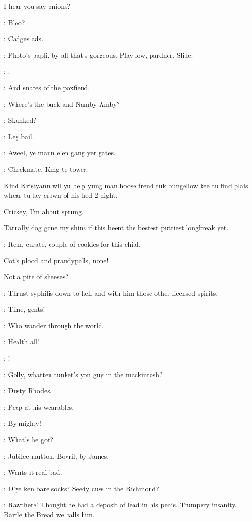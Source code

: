 I hear you say onions?

\bannon: Bloo?

\dixon: Cadges ads.

\bannon: Photo's papli, by all that's gorgeous.
Play low, pardner.
Slide.

\mulligan: .


\stephen: And snares of the poxfiend.

\bantam: Where's the buck and Namby Amby?

\stephen: Skunked?

\lenehan: Leg bail.

\crotthers: Aweel, ye maun e'en gang yer gates.

\stephen: Checkmate. King to tower.

Kind Kristyann wil yu help yung man hoose frend
tuk bungellow kee tu find plais whear tu lay crown of his hed 2 night.

Crickey, I'm about sprung.

Tarnally dog gone my shins if this beent the
bestest puttiest longbreak yet.

\punch: Item, curate, couple of cookies for this child.

Cot's plood and prandypalls, none!

Not a pite of sheeses?

\stephen: Thrust syphilis down to hell and with him those other licensed spirits.

\barman: Time, gents!

\stephen: Who wander through the world.

\punch: Health all!

\dixon: !


\crotthers: Golly, whatten tunket's yon guy in the mackintosh?

\lenehan: Dusty Rhodes.

\lynch: Peep at his wearables.

\crotthers: By mighty!

\stephen: What's he got?

\dixon: Jubilee mutton.
Bovril, by James.

\lenehan: Wants it real bad.

\crotthers: D'ye ken bare socks?
Seedy cuss in the Richmond?

\dixon: Rawthere!
Thought he had a deposit of lead in his penis.
Trumpery insanity.
Bartle the Bread we calls him.

